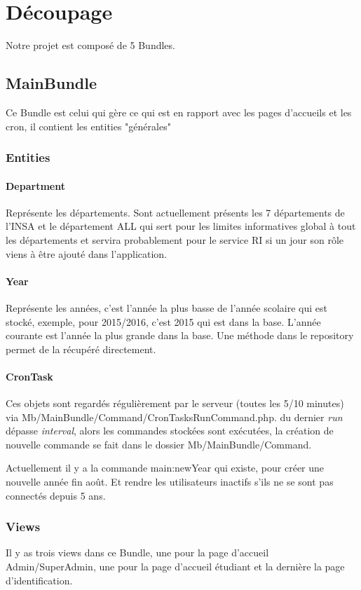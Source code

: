 
\chapter{Découpage}
Notre projet est composé de 5 Bundles.

\section{MainBundle}
Ce Bundle est celui qui gère ce qui est en rapport avec les pages d'accueils et les cron, il contient les entities "générales"

\subsection{Entities}
\subsubsection{Department}
Représente les départements. Sont actuellement présents les 7 départements de l'INSA et le département ALL qui sert pour les limites informatives global à tout les départements et servira probablement pour le service RI si un jour son rôle viens à être ajouté dans l'application.

\subsubsection{Year}
Représente les années, c'est l'année la plus basse de l'année scolaire qui est stocké, exemple, pour 2015/2016, c'est 2015 qui est dans la base. L'année courante est l'année la plus grande dans la base. Une méthode dans le repository permet de la récupéré directement.

\subsubsection{CronTask}

Ces objets sont regardés régulièrement par le serveur (toutes les 5/10 minutes) via Mb/MainBundle/Command/CronTasksRunCommand.php. 
du dernier \textit{run} dépasse \textit{interval}, alors les commandes stockées sont exécutées, la création de nouvelle commande se fait dans le dossier 
Mb/MainBundle/Command. 

Actuellement il y a la commande main:newYear qui existe, pour créer une nouvelle année fin août. Et rendre les utilisateurs inactifs s'ils ne se sont pas connectés depuis 5 ans.


\subsection{Views}
Il y as trois views dans ce Bundle, une pour la page d'accueil Admin/SuperAdmin, une pour la page d'accueil étudiant et la dernière la page d'identification.

